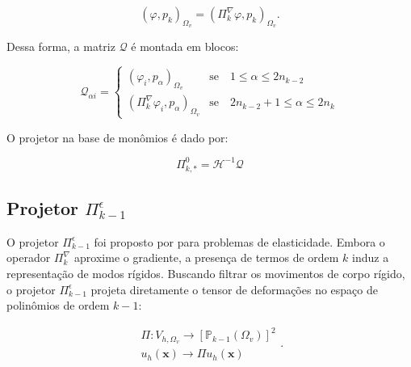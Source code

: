     \begin{equation}
        (\varphi,p_k)_{\Omega_v} = (\Pi_k^\nabla \varphi,p_k)_{\Omega_v}.
        \label{eq:4.42}
    \end{equation}

    \indent Dessa forma, a matriz $\mathcal{Q}$ é montada em blocos: 
    
    \begin{equation}
        \mathcal{Q}_{\alpha i} = \begin{cases} \left(\varphi_i,p_\alpha\right)_{\Omega_v} & \text{se} \quad 1 \leq \alpha \leq 2n_{k-2} \\ \left(\Pi_k^\nabla \varphi_i, p_\alpha\right)_{\Omega_v} & \text{se} \quad 2n_{k-2} + 1 \leq \alpha \leq 2n_k \end{cases}
        \label{eq:4.43}
    \end{equation}

    \indent O projetor na base de monômios é dado por: 
    
    \begin{equation}
        \Pi_{k,*}^0 = \mathcal{H}^{-1} \mathcal{Q}
        \label{eq:4.44}
    \end{equation}

\subsection{Projetor \texorpdfstring{$\Pi_{k-1}^{\epsilon}$}{Pi k-1 epsilon}}
\label{sec:projetor-de-deformacoes}

    \indent O projetor $\Pi_{k-1}^\epsilon$ foi proposto por \citet{arbitraryorder2dvirtualelementspolygonalmeshespartelasticproblem2017a} para problemas de elasticidade. Embora o operador $\Pi_k^\nabla$ aproxime o gradiente, a presença de termos de ordem $k$ induz a representação de modos rígidos. Buscando filtrar os movimentos de corpo rígido, o projetor $\Pi_{k-1}^\epsilon$ projeta diretamente o tensor de deformações no espaço de polinômios de ordem $k-1$: 

    \begin{equation}
        \begin{aligned} 
            \Pi : V_{h,\Omega_v} \longrightarrow \left[ \mathbb{P}_{k-1}(\Omega_v) \right]^2 \\ 
                u_h (\mathbf{x}) \rightarrow \Pi u_h(\mathbf{x}) 
        \end{aligned}.
        \label{eq:4.45}
    \end{equation}

